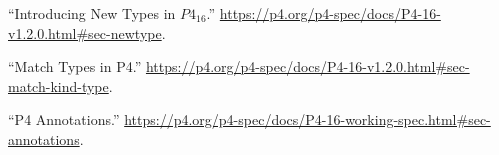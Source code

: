 \documentclass[11pt]{article}
\begin{document}
{{\begin{thebibliography}{39}
\mdbibitemlabel{{}[11]}\textquotedblleft{}Introducing New Types in $P4_{16}$.\textquotedblright{} \href{https://p4.org/p4-spec/docs/P4-16-v1.2.0.html\%23sec-newtype}{{\ttfamily https://\hspace{0pt}p4.\hspace{0pt}org/\hspace{0pt}p4-\hspace{0pt}spec/\hspace{0pt}docs/\hspace{0pt}P4-\hspace{0pt}16-\hspace{0pt}v1.\hspace{0pt}2.\hspace{0pt}0.\hspace{0pt}html\#\hspace{0pt}sec-\hspace{0pt}newtype}}.\label{p4newtypes}%

\mdbibitemlabel{{}[12]}\textquotedblleft{}Match Types in P4.\textquotedblright{} \href{https://p4.org/p4-spec/docs/P4-16-v1.2.0.html\%23sec-match-kind-type}{{\ttfamily https://\hspace{0pt}p4.\hspace{0pt}org/\hspace{0pt}p4-\hspace{0pt}spec/\hspace{0pt}docs/\hspace{0pt}P4-\hspace{0pt}16-\hspace{0pt}v1.\hspace{0pt}2.\hspace{0pt}0.\hspace{0pt}html\#\hspace{0pt}sec-\hspace{0pt}match-\hspace{0pt}kind-\hspace{0pt}type}}.\label{p4matchtypes}%

\mdbibitemlabel{{}[13]}\textquotedblleft{}P4 Annotations.\textquotedblright{} \href{https://p4.org/p4-spec/docs/P4-16-working-spec.html\%23sec-annotations}{{\ttfamily https://\hspace{0pt}p4.\hspace{0pt}org/\hspace{0pt}p4-\hspace{0pt}spec/\hspace{0pt}docs/\hspace{0pt}P4-\hspace{0pt}16-\hspace{0pt}working-\hspace{0pt}spec.\hspace{0pt}html\#\hspace{0pt}sec-\hspace{0pt}annotations}}.\label{p4annotations}%


\end{thebibliography}}}
\end{document}
